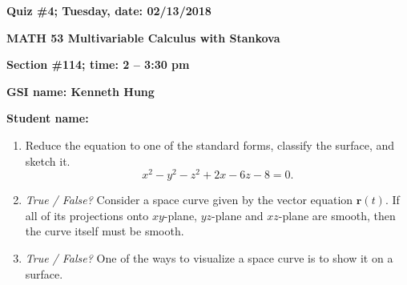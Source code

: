\documentclass{article}
\newcommand{\rr}{\mathbf{r}}
\begin{document}
{\bf Quiz \#4; Tuesday, date: 02/13/2018}

{\bf MATH 53 Multivariable Calculus with Stankova}

{\bf Section \#114; time: 2 -- 3:30 pm}

{\bf GSI name: Kenneth Hung}

{\bf Student name:}

\vspace*{0.25in}

\begin{enumerate}
\item Reduce the equation to one of the standard forms, classify the surface, and sketch it.
\[
x^2 - y^2 - z^2 + 2x - 6z - 8 = 0.
\]

\item {\em True / False?} Consider a space curve given by the vector equation $\rr(t)$. If all of its projections onto $xy$-plane, $yz$-plane and $xz$-plane are smooth, then the curve itself must be smooth.

\item {\em True / False?} One of the ways to visualize a space curve is to show it on a surface.
\end{enumerate}
\end{document}
